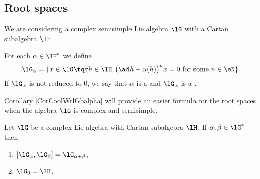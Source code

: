\subsection{Root spaces}

We are considering a complex semisimple Lie algebra \( \lG\) with a Cartan subalgebra \( \lH\).

\begin{definition}      \label{DefRootSpace}
    For each \( \alpha\in\lH^*\) we define
    \begin{equation}            \label{eq:lG_alpha_nss}
        \lG_{\alpha}=\{  x\in\lG\tq\forall h\in\lH, \big(\ad h-\alpha(h)\big)^nx=0\text{ for some $n\in\eN$}    \}.
    \end{equation}
    If \( \lG_{\alpha}\) is not reduced to \( 0\), we say that \( \alpha\) is a  and \( \lG_{\alpha}\) is a .
\end{definition}
Corollary \ref{CorCoolWrlGbalpha} will provide an easier formula for the root spaces when the algebra \( \lG\) is complex and semisimple.
\begin{theorem}     \label{TholGCartalphaplusbeta}
Let $\lG$ be a complex Lie algebra with Cartan subalgebra $\lH$. If $\alpha,\beta\in\lG^*$ then
\begin{enumerate}
    \item   \label{ItemTholGCartalphaplusbetai}
    $[\lG_{\alpha},\lG_{\beta}]=\lG_{\alpha+\beta}$,
\item $\lG_0=\lH$.
\end{enumerate}
\label{prop:deux_racine}
\end{theorem}

